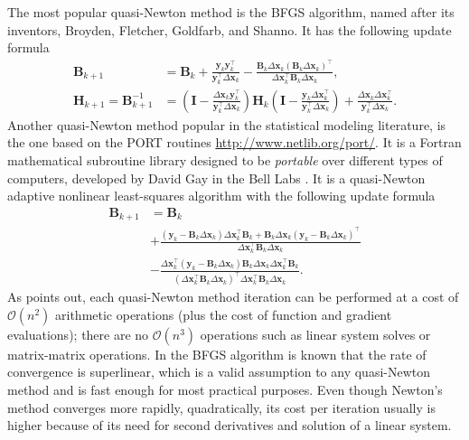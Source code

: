 The most popular quasi-Newton method is the BFGS algorithm, named after
its inventors, Broyden, Fletcher, Goldfarb, and Shanno. It has the
following update formula
\begin{align*}
 \bm{B}_{k+1} &= \bm{B}_{k} +
                \frac{\bm{y}_{k}\bm{y}_{k}^{\top}}{
                      \bm{y}_{k}^{\top}\Delta\bm{x}_{k}} -
                \frac{\bm{B}_{k}\Delta\bm{x}_{k}
                     (\bm{B}_{k}\Delta\bm{x}_{k})^{\top}}{
                      \Delta\bm{x}_{k}^{\top}\bm{B}_{k}
                      \Delta\bm{x}_{k}},\\
 \bm{H}_{k+1} = \bm{B}_{k+1}^{-1}
            &= \left(\bm{I} -
                     \frac{\Delta\bm{x}_{k}\bm{y}_{k}^{\top}}{
                           \bm{y}_{k}^{\top}\Delta\bm{x}_{k}}
                \right) \bm{H}_{k}
                \left(\bm{I} -
                      \frac{\bm{y}_{k}\Delta\bm{x}_{k}^{\top}}{
                            \bm{y}_{k}^{\top}\Delta\bm{x}_{k}}
                \right) + \frac{\Delta\bm{x}_{k}
                                \Delta\bm{x}_{k}^{\top}}{
                                \bm{y}_{k}^{\top}\Delta\bm{x}_{k}}.
\end{align*}
Another quasi-Newton method popular in the statistical modeling
literature, is the one based on the PORT routines
\url{http://www.netlib.org/port/}. It is a Fortran mathematical
subroutine library designed to be \textit{portable} over different types
of computers, developed by David Gay in the Bell Labs \cite{PORTreport}.
It is a quasi-Newton adaptive nonlinear least-squares algorithm
\cite{PORTpaper} with the following update formula
\begin{align*}
 \bm{B}_{k+1} &= \bm{B}_{k}\\
             &+ \frac{
                 \left(\bm{y}_{k} - \bm{B}_{k}\Delta\bm{x}_{k}\right)
                 \Delta\bm{x}_{k}^{\top}\bm{B}_{k} +
                 \bm{B}_{k}\Delta\bm{x}_{k}
                 \left(\bm{y}_{k} - \bm{B}_{k}\Delta\bm{x}_{k}
                 \right)^{\top}}{
                 \Delta\bm{x}_{k}^{\top}\bm{B}_{k}\Delta\bm{x}_{k}}\\
             &- \frac{
                 \Delta\bm{x}_{k}^{\top}
                 \left(\bm{y}_{k} - \bm{B}_{k}\Delta\bm{x}_{k}\right)
                 \bm{B}_{k}\Delta\bm{x}_{k}
                 \Delta\bm{x}_{k}^{\top}\bm{B}_{k}}{
                 \left(\Delta\bm{x}_{k}^{\top}\bm{B}_{k}\Delta\bm{x}_{k}
                 \right)^{\top}
                 \Delta\bm{x}_{k}^{\top}\bm{B}_{k}\Delta\bm{x}_{k}}.
\end{align*}
As  points out, each quasi-Newton method
iteration can be performed at a cost of \(\mathcal{O}(n^{2})\)
arithmetic operations (plus the cost of function and gradient
evaluations); there are no \(\mathcal{O}(n^{3})\) operations such as
linear system solves or matrix-matrix operations. In the BFGS algorithm
is known that the rate of convergence is superlinear, which is a valid
assumption to any quasi-Newton method and is fast enough for most
practical purposes. Even though Newton's method converges more rapidly,
quadratically, its cost per iteration usually is higher because of its
need for second derivatives and solution of a linear system.

